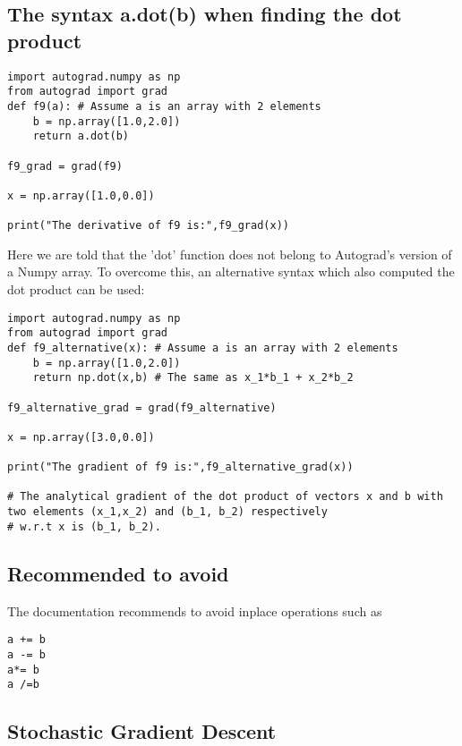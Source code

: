 \documentclass[%
oneside,                 %
final,                   %
10pt]{article}
\begin{document}
\subsection*{The syntax a.dot(b) when finding the dot product}
\begin{verbatim}
import autograd.numpy as np
from autograd import grad
def f9(a): # Assume a is an array with 2 elements
    b = np.array([1.0,2.0])
    return a.dot(b)

f9_grad = grad(f9)

x = np.array([1.0,0.0])

print("The derivative of f9 is:",f9_grad(x))
\end{verbatim}

Here we are told that the 'dot' function does not belong to Autograd's
version of a Numpy array.  To overcome this, an alternative syntax
which also computed the dot product can be used:

\begin{verbatim}
import autograd.numpy as np
from autograd import grad
def f9_alternative(x): # Assume a is an array with 2 elements
    b = np.array([1.0,2.0])
    return np.dot(x,b) # The same as x_1*b_1 + x_2*b_2

f9_alternative_grad = grad(f9_alternative)

x = np.array([3.0,0.0])

print("The gradient of f9 is:",f9_alternative_grad(x))

# The analytical gradient of the dot product of vectors x and b with two elements (x_1,x_2) and (b_1, b_2) respectively
# w.r.t x is (b_1, b_2).
\end{verbatim}

\subsection*{Recommended to avoid}
The documentation recommends to avoid inplace operations such as
\begin{verbatim}
a += b
a -= b
a*= b
a /=b
\end{verbatim}

\subsection*{Stochastic Gradient Descent}
\end{document}
